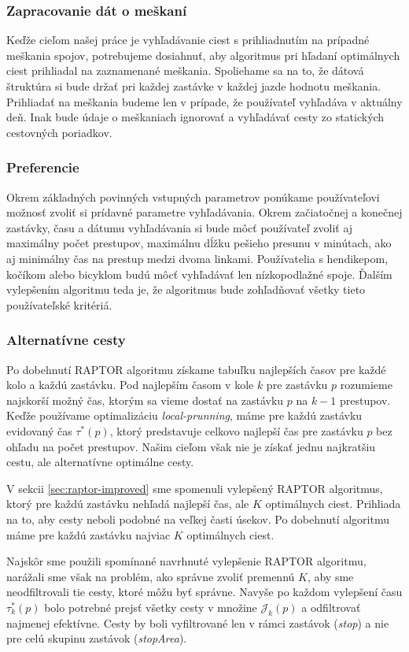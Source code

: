 \subsubsection{Zapracovanie dát o meškaní}
Keďže cieľom našej práce je vyhľadávanie ciest s prihliadnutím na prípadné meškania spojov, potrebujeme dosiahnuť, aby algoritmus pri hľadaní optimálnych ciest prihliadal na zaznamenané meškania. Spoliehame sa na to, že dátová štruktúra si bude držať pri každej zastávke v každej jazde hodnotu meškania. Prihliadať na meškania budeme len v prípade, že používateľ vyhľadáva v aktuálny deň. Inak bude údaje o meškaniach ignorovať a vyhľadávať cesty zo statických cestovných poriadkov.

\subsubsection{Preferencie}
Okrem základných povinných vstupných parametrov ponúkame používateľovi možnosť zvoliť si prídavné parametre vyhľadávania. Okrem začiatočnej a konečnej zastávky, času a dátumu vyhľadávania si bude môcť používateľ zvoliť aj maximálny počet prestupov, maximálnu dĺžku pešieho presunu v minútach, ako aj minimálny čas na prestup medzi dvoma linkami. Používatelia s hendikepom, kočíkom alebo bicyklom budú môcť vyhľadávať len nízkopodlažné spoje. Ďalším vylepšením algoritmu teda je, že algoritmus bude zohľadňovať všetky tieto používateľské kritériá. 

\subsubsection{Alternatívne cesty}
Po dobehnutí RAPTOR algoritmu získame tabuľku najlepších časov pre každé kolo a každú zastávku. Pod najlepším časom v kole $k$ pre zastávku $p$ rozumieme najskorší možný čas, ktorým sa vieme dostať na zastávku $p$ na $k-1$ prestupov. Keďže používame optimalizáciu \textit{local-prunning}, máme pre každú zastávku evidovaný čas $\tau^*(p)$, ktorý predstavuje celkovo najlepší čas pre zastávku $p$ bez ohľadu na počet prestupov. Našim cieľom však nie je získať jednu najkratšiu cestu, ale alternatívne optimálne cesty.

V sekcii \ref{sec:raptor-improved} sme spomenuli vylepšený RAPTOR algoritmus, ktorý pre každú zastávku nehľadá najlepší čas, ale $K$ optimálnych ciest. Prihliada na to, aby cesty neboli podobné na veľkej časti úsekov. Po dobehnutí algoritmu máme pre každú zastávku najviac $K$ optimálnych ciest.

Najskôr sme použili spomínané navrhnuté vylepšenie RAPTOR algoritmu, narážali sme však na problém, ako správne zvoliť premennú $K$, aby sme neodfiltrovali tie cesty, ktoré môžu byť správne. Navyše po každom vylepšení času $\tau^*_k(p)$ bolo potrebné prejsť všetky cesty v množine $\mathcal{J}_k(p)$ a odfiltrovať najmenej efektívne. Cesty by boli vyfiltrované len v rámci zastávok (\textit{stop}) a nie pre celú skupinu zastávok (\textit{stopArea}).

